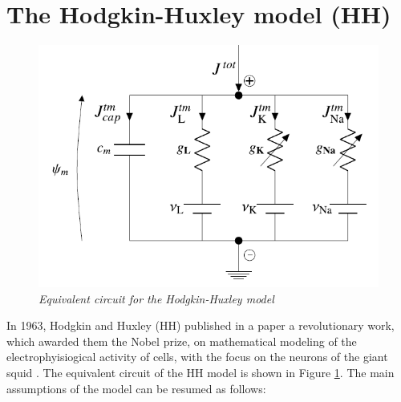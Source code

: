 \documentclass[12pt, a4paper]{report}
\begin{document}
\section{The Hodgkin-Huxley model (HH)}

\begin{figure}[H]
	\begin{center}
		\includegraphics[scale=0.65]{HH.png} 
	\end{center} 
	\caption{\textit{Equivalent circuit for the Hodgkin-Huxley model}} \label{HH}
	
\end{figure}


In 1963, Hodgkin and Huxley (HH) published in a paper a revolutionary work, which awarded them the Nobel prize, on mathematical modeling of the electrophyisiogical activity of cells, with the focus on the neurons of the giant squid \cite{37}.  %
The equivalent circuit of the HH model is shown in Figure \ref{HH}. The main assumptions of the model can be resumed as follows:
\end{document}
